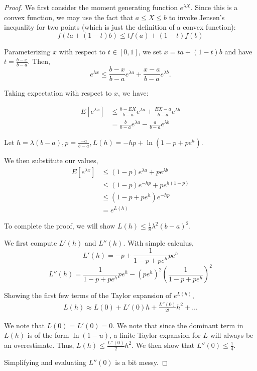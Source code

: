 \documentclass{article}
\begin{document}
\begin{proof}

We first consider the moment generating function $e^{\lambda X}$. Since this is
a convex function, we may use the fact that $a \leq X \leq b$ to invoke Jensen's
inequality for two points (which is just the definition of a convex function):
$$f(t a + (1-t)b) \leq t f(a) + (1-t)f(b)$$

Parameterizing $x$ with respect to $t \in [0, 1]$, we set $x = ta + (1-t)b$ and
have $ t = \frac{b-x}{b-a}$. Then,
$$e^{\lambda x} \leq \frac{b-x}{b-a} e^{\lambda a} + \frac{x-a}{b-a}e^{\lambda b}.$$

Taking expectation with respect to $x$, we have:

\begin{align*}
    E[e^{\lambda x}] &\leq \frac{b - EX}{b-a}e^{\lambda a} + \frac{EX - a}{b-a}e^{\lambda b}\\
        &= \frac{b}{b-a} e^{\lambda a} - \frac{a}{b-a} e^{\lambda b}
\end{align*}

Let $h = \lambda(b-a), p = \frac{-a}{b-a}, L(h) = -hp + \ln(1-p+pe^h)$.

We then substitute our values,
\begin{align*}
    E[e^{\lambda x}] &\leq (1-p)e^{\lambda a} + pe^{\lambda b}\\
        &\leq (1-p)e^{-hp} + pe^{h(1-p)}\\
        &\leq (1-p+pe^h)e^{-hp}\\
        &= e^{L(h)}
\end{align*}

To complete the proof, we will show $L(h) \leq \frac{1}{8}\lambda^2(b-a)^2$.

We first compute $L'(h)$ and $L''(h)$. With simple calculus,
$$L'(h) = -p + \frac{1}{1-p+pe^h} pe^h$$
$$L''(h) = \frac{1}{1-p+pe^h}pe^h - (pe^h)^2(\frac{1}{1-p+pe^h})^2$$

Showing the first few terms of the Taylor expansion of $e^{L(h)}$,
\begin{align*}
    L(h) \approx L(0) + L'(0) h + \frac{L''(0)}{2!} h^2 + \dots
\end{align*}

We note that $L(0) = L'(0) = 0$. We note that since the dominant term in $L(h)$
is of the form $\ln(1-u)$, a finite Taylor expansion for $L$ will always be an
overestimate. Thus, $L(h) \leq \frac{L''(0)}{2} h^2$. We then show that $L''(0)
\leq \frac{1}{4}$.

Simplifying and evaluating $L''(0)$ is a bit messy.


\end{proof}
\end{document}
